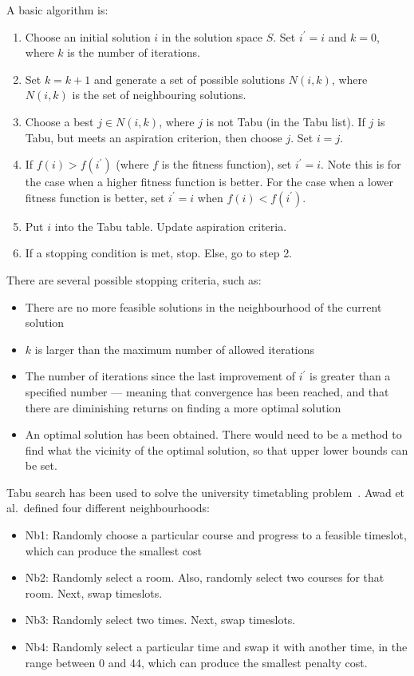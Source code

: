 \documentclass[a4paper, 12pt]{report}
\begin{document}
A basic algorithm is:
\begin{enumerate}
	\item Choose an initial solution \( i \) in the solution space \( S \).
		Set \( i^\prime=i \) and \( k = 0 \), where \( k \) is the number of
		iterations.
	\item Set \( k = k + 1 \) and generate a set of possible solutions
		\( N(i,k) \), where \( N(i,k) \) is the set of neighbouring solutions.
	\item Choose a best \( j \in N(i,k) \), where \( j \) is not Tabu (in the
		Tabu list).
		If \( j \) is Tabu, but meets an aspiration criterion, then choose
		\( j \).
		Set \( i = j \).
	\item If \( f(i) > f(i^\prime) \) (where \( f \) is the fitness function),
		set \( i^\prime = i \).
		Note this is for the case when a higher fitness function is better.
		For the case when a lower fitness function is better, set
		\( i^\prime = i \) when \( f(i) < f(i^\prime) \).
	\item Put \( i \) into the Tabu table. Update aspiration criteria.
	\item If a stopping condition is met, stop. Else, go to step 2.
\end{enumerate}
There are several possible stopping criteria, such as:
\begin{itemize}
	\item There are no more feasible solutions in the neighbourhood of the
		current solution
	\item \( k \) is larger than the maximum number of allowed iterations
	\item The number of iterations since the last improvement of \( i^\prime \)
		is greater than a specified number –-- meaning that convergence has been
		reached, and that there are diminishing returns on finding a more
		optimal solution
	\item An optimal solution has been obtained.
		There would need to be a method to find what the vicinity of the optimal
		solution, so that upper lower bounds can be set.
\end{itemize}
Tabu search has been used to solve the university timetabling
problem~\cite{tabu_example}.
Awad et al.\ defined four different neighbourhoods:
\begin{itemize}
	\item Nb1: Randomly choose a particular course and progress to a feasible
		timeslot, which can produce the smallest cost
	\item Nb2: Randomly select a room. Also, randomly select two courses for
		that room. Next, swap timeslots.
	\item Nb3: Randomly select two times. Next, swap timeslots.
	\item Nb4: Randomly select a particular time and swap it with another time,
		in the range between 0 and 44, which can produce the smallest penalty
		cost.
\end{itemize}
\end{document}
